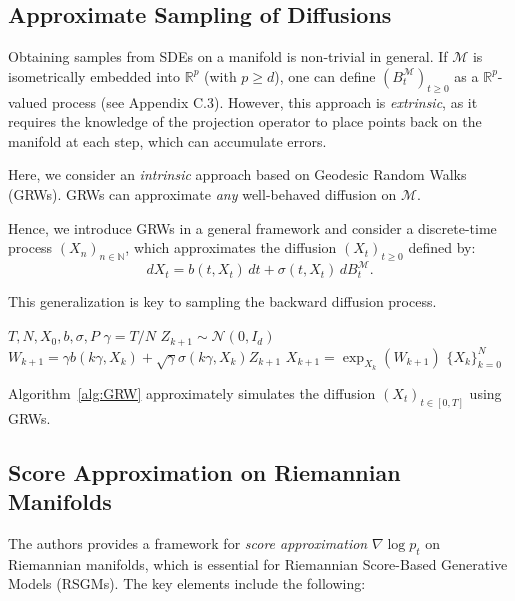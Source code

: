 \documentclass[a4paper,14pt]{article}
\renewcommand{\geq}{\ensuremath{\geqslant}}
\theoremstyle{plain} %
\theoremstyle{definition} %
\theoremstyle{remark} %
\theoremstyle{definition}
\theoremstyle{remark}
\theoremstyle{remark}
\begin{document}
	\subsection{Approximate Sampling of Diffusions}
	
	Obtaining samples from SDEs on a manifold is non-trivial in general. If \( \mathcal{M} \) is isometrically embedded into \( \mathbb{R}^p \) (with \( p \geq d \)), one can define \( (B_t^\mathcal{M})_{t \geq 0} \) as a \( \mathbb{R}^p \)-valued process (see Appendix C.3). However, this approach is \textit{extrinsic}, as it requires the knowledge of the projection operator to place points back on the manifold at each step, which can accumulate errors.
	
	Here, we consider an \textit{intrinsic} approach based on Geodesic Random Walks (GRWs). GRWs can approximate \textit{any} well-behaved diffusion on \( \mathcal{M} \).
	
	Hence, we introduce GRWs in a general framework and consider a discrete-time process \( (X_n)_{n \in \mathbb{N}} \), which approximates the diffusion \( (X_t)_{t \geq 0} \) defined by:
	\[
	dX_t = b(t, X_t) \, dt + \sigma(t, X_t) \, dB_t^\mathcal{M}.
	\]
	
	This generalization is key to sampling the backward diffusion process.
	
	\begin{algorithm}[H]
		\caption{GRW (Geodesic Random Walk)}
		\label{alg:GRW}
		\begin{algorithmic}[1]
			\Require \( T, N, X_0, b, \sigma, P \)
			\State \( \gamma = T / N \) 
			\State \( Z_{k+1} \sim \mathcal{N}(0, I_d) \) 
			\State \( W_{k+1} = \gamma b(k \gamma, X_k) + \sqrt{\gamma} \sigma(k \gamma, X_k) Z_{k+1} \) 
			\State \( X_{k+1} = \exp_{X_k}(W_{k+1}) \) 
			\EndFor
			\State \Return \( \{ X_k \}_{k=0}^N \)
		\end{algorithmic}
	\end{algorithm}

	Algorithm~\ref{alg:GRW} approximately simulates the diffusion \( (X_t)_{t \in [0, T]} \) using GRWs.
	
	\subsection{Score Approximation on Riemannian Manifolds}
	The authors provides a framework for \textit{score approximation} \( \nabla \log p_t \) on Riemannian manifolds, which is essential for Riemannian Score-Based Generative Models (RSGMs). The key elements include the following:
	
\end{document}
